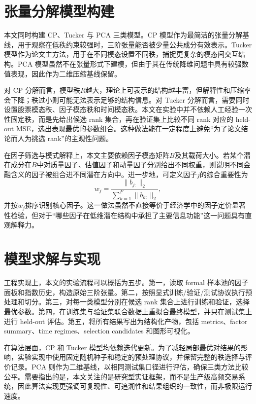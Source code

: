 \section{张量分解模型构建}

本文同时构建 CP、Tucker 与 PCA 三类模型。CP 模型作为最简洁的张量分解基线，用于观察在低秩约束较强时，三阶张量能否被少量公共成分有效表示。Tucker 模型作为论文主方法，用于在不同模态设置不同秩，捕捉更复杂的模态间交互结构。PCA 模型虽然不在张量形式下建模，但由于其在传统降维问题中具有较强数值表现，因此作为二维压缩基线保留。

对 CP 分解而言，模型秩$R$越大，理论上可表示的结构越丰富，但解释性和压缩率会下降；秩过小则可能无法表示足够的结构信息。对 Tucker 分解而言，需要同时设置股票模态秩、因子模态秩和时间模态秩。本文在实验中并不依赖人工经验一次性固定秩，而是先给出候选 rank 集合，再在验证集上比较不同 rank 对应的 held-out MSE，选出表现最优的参数组合。这种做法能在一定程度上避免“为了论文结论而人为挑选 rank”的主观性问题。

在因子筛选与模式解释上，本文主要依赖因子模态矩阵$B$及其载荷大小。若某个潜在成分在$B$中对质量因子、估值因子和动量因子分别给出不同权重，则说明不同金融含义的因子被组合进不同潜在方向中。进一步地，可定义因子$j$的综合重要性为
\begin{equation}
w_j=\frac{\|b_{j:}\|_2}{\sum_{k=1}^{F}\|b_{k:}\|_2},
\end{equation}
并按$w_j$排序识别核心因子。这一做法虽然不直接等价于经济学中的因子定价显著性检验，但对于“哪些因子在低维潜在结构中承担了主要信息功能”这一问题具有直观解释力。

\section{模型求解与实现}

工程实现上，本文的实验流程可以概括为五步。第一，读取 formal 样本池的因子面板和指数历史，构造原始三阶张量。第二，按照显式训练/验证/测试协议执行预处理和切分。第三，对每一类模型分别在候选 rank 集合上进行训练和验证，选择最优参数。第四，在训练集与验证集联合数据上重拟合最终模型，并只在测试集上进行 held-out 评估。第五，将所有结果写出为结构化产物，包括 metrics、factor summary、time regimes、selection candidates 和图形可视化。

在算法层面，CP 和 Tucker 模型均依赖迭代更新。为了减轻局部最优对结果的影响，实验实现中使用固定随机种子和稳定的预处理协议，并保留完整的秩选择与评价记录。PCA 则作为二维基线，以相同测试集口径进行评估，确保三类方法比较公平。需要指出的是，本文关注的是研究型实证框架，而不是生产级高频交易系统，因此算法实现更强调可复现性、可追溯性和结果组织的一致性，而非极限运行速度。

